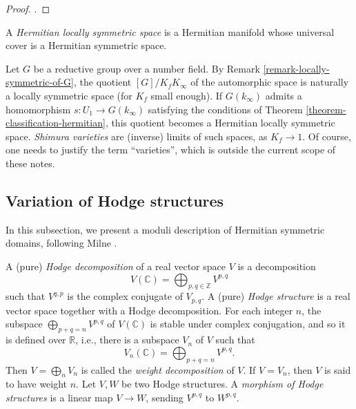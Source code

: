 \begin{proof}
  \cite[Theorem 1.21]{Milne-Shimura}.
\end{proof}


\begin{definition}
 \label{definition-hermitian-locally-symmetric-space}
A {\it Hermitian locally symmetric space} is a Hermitian manifold whose universal cover is a Hermitian symmetric space.
\end{definition}

\begin{remark}
  \label{remark-hermitian-locally-symmetric-of-G}
Let $G$ be a reductive group over a number field. By Remark  \ref{remark-locally-symmetric-of-G}, the quotient $[G]/K_f K_\infty$  of the automorphic space is naturally a locally symmetric space (for $K_f$ small enough). If $G(k_\infty)$ admits a homomorphism $s:U_1\to G(k_\infty)$ satisfying the conditions of Theorem  \ref{theorem-classification-hermitian}, this quotient becomes a Hermitian locally symmetric space. {\it Shimura varieties} are (inverse) limits of such spaces, as $K_f\to 1$. Of course, one needs to justify the term ``varieties'', which is outside the current scope of these notes. 

\end{remark}



\subsection{Variation of Hodge structures}
\label{subsection-variation-Hodge}

In this subsection, we present a moduli description of Hermitian symmetric domains, following Milne \cite{Milne-Shimura}.

\begin{definition}
 \label{definition-Hodge}
 A (pure) {\it Hodge decomposition} of a real vector space $V$ is a decomposition
$$
V(\mathbb C)= \bigoplus_{p,q\in \mathbb Z} V^{p,q}
$$
such that $V^{q,p}$ is the complex conjugate of $V_{p,q}$. A (pure) {\it Hodge structure} is a real vector space together with a Hodge decomposition. For each integer $n$, the subspace $\bigoplus_{p+q=n}V^{p,q}$ of $V(\mathbb C)$ is stable under complex conjugation, and so it is defined over $\mathbb R$, i.e., there is a subspace $V_n$ of $V$ such that
$$
V_n(\mathbb C)=\bigoplus_{p+q=n}V^{p,q}.
$$
Then $V=\bigoplus_n V_n$ is called the {\it weight decomposition} of $V$. If $V=V_n$, then $V$ is said to have weight $n$. Let $V,W$ be two Hodge structures. A {\it morphism of Hodge structures} is a linear map $V \to W$, sending $V^{p,q}$ to $W^{p,q}$.
\end{definition}


